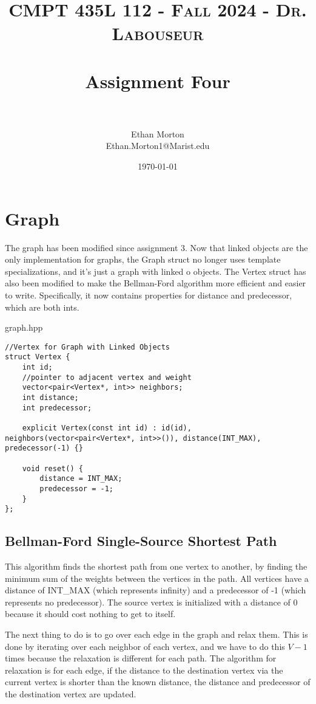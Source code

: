 \documentclass[letterpaper, 10pt,DIV=13]{scrartcl}
\title{	
   \normalfont \normalsize 
   \textsc{CMPT 435L 112 - Fall 2024 - Dr. Labouseur} \\[10pt] %
   \horrule{0.5pt} \\[0.25cm] 	%
   \huge Assignment Four  \\     	    %
   \horrule{0.5pt} \\[0.25cm] 	%
}
\author{Ethan Morton \\ \normalsize Ethan.Morton1@Marist.edu}
\date{\normalsize\today} 	%
\numberwithin{equation}{section} %
\numberwithin{figure}{section} %
\numberwithin{table}{section} %
\begin{document}
\maketitle %

\section{Graph}
The graph has been modified since assignment 3. Now that linked objects are the only implementation for graphs, the Graph struct no longer uses template specializations, and it's just a graph with linked o objects. The Vertex struct has also been modified to make the Bellman-Ford algorithm more efficient and easier to write. Specifically, it now contains properties for distance and predecessor, which are both ints.

graph.hpp
\begin{verbatim}
//Vertex for Graph with Linked Objects
struct Vertex {
    int id;
    //pointer to adjacent vertex and weight
    vector<pair<Vertex*, int>> neighbors;
    int distance;
    int predecessor;
    
    explicit Vertex(const int id) : id(id), neighbors(vector<pair<Vertex*, int>>()), distance(INT_MAX), predecessor(-1) {}

    void reset() {
        distance = INT_MAX;
        predecessor = -1;
    }
};
\end{verbatim}

\subsection{Bellman-Ford Single-Source Shortest Path}

This algorithm finds the shortest path from one vertex to another, by finding the minimum sum of the weights between the vertices in the path. All vertices have a distance of INT\_MAX (which represents infinity) and a predecessor of -1 (which represents no predecessor). The source vertex is initialized with a distance of 0 because it should cost nothing to get to itself.

The next thing to do is to go over each edge in the graph and relax them. This is done by iterating over each neighbor of each vertex, and we have to do this $V-1$ times because the relaxation is different for each path. The algorithm for relaxation is for each edge, if the distance to the destination vertex via the current vertex is shorter than the known distance, the distance and predecessor of the destination vertex are updated.
\end{document}
